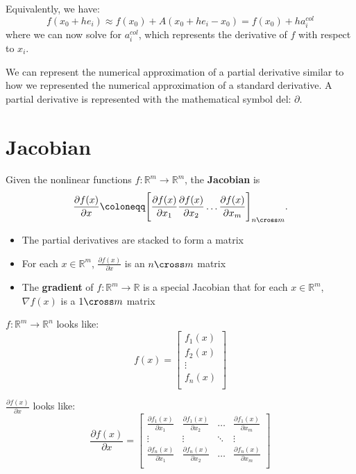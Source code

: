 Equivalently, we have:
\[
  f(x_0 + he_i) \approx f(x_0) + A(x_0 + he_i - x_0) = f(x_0) + h a_i^{col}
\]
where we can now solve for \(a_i^{col}\), which represents the derivative of \(f\) with respect to \(x_i\).

We can represent the numerical approximation of a partial derivative similar to how we represented the numerical approximation of a standard derivative. A partial derivative is represented with the mathematical symbol del: \(\partial\).

\section{Jacobian}
Given the nonlinear functions \(f: \mathbb{R}^m \to \mathbb{R}^m\), the \textbf{Jacobian} is
\[
  \frac{\partial f(x)}{\partial x} \coloneqq \Bigg [ \frac{\partial f(x)}{\partial x_1} \frac{\partial f(x)}{\partial x_2} \ldots \frac{\partial f(x)}{\partial x_m} \Bigg ]_{n \cross m}.
\]
\begin{itemize}
  \item The partial derivatives are stacked to form a matrix
  \item For each \(x \in \mathbb{R}^m \), \(\frac{\partial f(x)}{\partial x}\) is an \(n \cross m\) matrix
  \item The \textbf{gradient} of \(f: \mathbb{R}^m \to \mathbb{R} \) is a special Jacobian that for each \(x \in \mathbb{R}^m \), \(\nabla f(x)\) is a \(1 \cross m\) matrix 
\end{itemize}

\(f: \mathbb{R}^m \to \mathbb{R}^n\) looks like:
\[
  f(x) =
  \begin{bmatrix}
    f_1(x) \\
    f_2(x) \\
    \vdots \\
    f_n(x) \\
  \end{bmatrix}
\]

\(\frac{\partial f(x)}{\partial x}\) looks like:
\[
  \frac{\partial f(x)}{\partial x} = \left[
    \begin{array}{cccc}
     \frac{\partial f_1(x)}{\partial x_1} & \frac{\partial f_1(x)}{\partial x_2} & \ldots & \frac{\partial f_1(x)}{\partial x_m} \\
     \vdots & \vdots & \ddots & \vdots \\
     \frac{\partial f_n(x)}{\partial x_1} & \frac{\partial f_n(x)}{\partial x_2} & \ldots & \frac{\partial f_n(x)}{\partial x_m} \\
    \end{array}
    \right]
\] 

